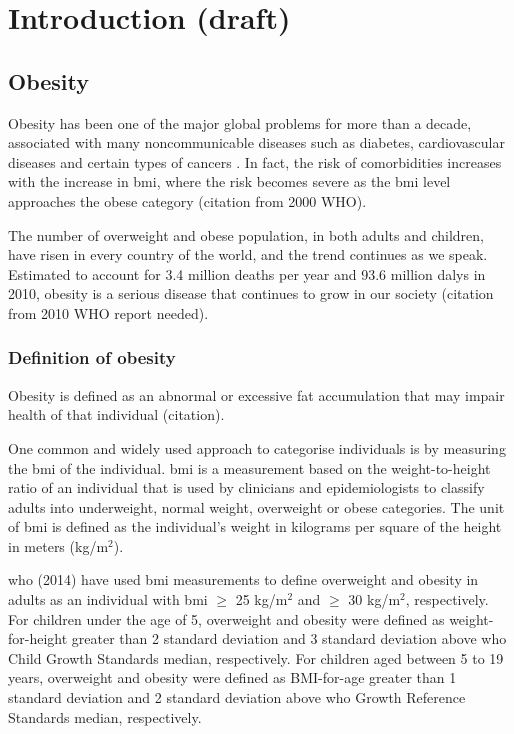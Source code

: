 \chapter{Introduction (draft)}
\label{ch:intro}


\section{Obesity}
\label{sec:obesity}

Obesity has been one of the major global problems for more than a decade, associated with many noncommunicable diseases such as diabetes, cardiovascular diseases and certain types of cancers \citep{WHO2014}.
In fact, the risk of comorbidities increases with the increase in \gls{bmi}, where the risk becomes severe as the \gls{bmi} level approaches the obese category (citation from 2000 WHO).

The number of overweight and obese population, in both adults and children, have risen in every country of the world, and the trend continues as we speak.
Estimated to account for 3.4 million deaths per year and 93.6 million \glspl{daly} in 2010, obesity is a serious disease that continues to grow in our society (citation from 2010 WHO report needed).

\subsection{Definition of obesity}
\label{sub:definition_of_obesity}

Obesity is defined as an abnormal or excessive fat accumulation that may impair health of that individual (citation).

One common and widely used approach to categorise individuals is by measuring the \gls{bmi} of the individual.
\gls{bmi} is a measurement based on the weight-to-height ratio of an individual that is used by clinicians and epidemiologists to classify adults into underweight, normal weight, overweight or obese categories.
The unit of \gls{bmi} is defined as the individual's weight in kilograms per square of the height in meters (kg/m$^2$).

\gls{who} (2014) have used \gls{bmi} measurements to define overweight and obesity in adults as an individual with \gls{bmi} $\geq$ 25 kg/m$^2$ and $\geq$ 30 kg/m$^2$, respectively.
For children under the age of 5, overweight and obesity were defined as weight-for-height greater than 2 standard deviation and 3 standard deviation above \gls{who} Child Growth Standards median, respectively.
For children aged between 5 to 19 years, overweight and obesity were defined as BMI-for-age greater than 1 standard deviation and 2 standard deviation above \gls{who} Growth Reference Standards median, respectively.

